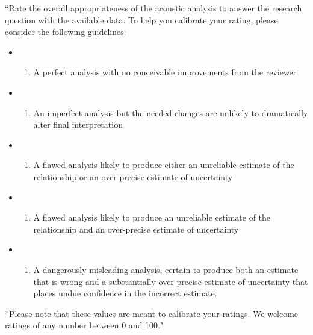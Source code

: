\documentclass[
  english,
  man]{apa6}
\providecommand{\tightlist}{%
  \setlength{\itemsep}{0pt}\setlength{\parskip}{0pt}}
\begin{document}
``Rate the overall appropriateness of the acoustic analysis to answer the research question with the available data. To help you calibrate your rating, please consider the following guidelines:

\begin{itemize}
\item
  \begin{enumerate}
  \def\labelenumi{\arabic{enumi}.}
  \setcounter{enumi}{99}
  \tightlist
  \item
    A perfect analysis with no conceivable improvements from the reviewer
  \end{enumerate}
\item
  \begin{enumerate}
  \def\labelenumi{\arabic{enumi}.}
  \setcounter{enumi}{74}
  \tightlist
  \item
    An imperfect analysis but the needed changes are unlikely to dramatically alter final interpretation
  \end{enumerate}
\item
  \begin{enumerate}
  \def\labelenumi{\arabic{enumi}.}
  \setcounter{enumi}{49}
  \tightlist
  \item
    A flawed analysis likely to produce either an unreliable estimate of the relationship or an over-precise estimate of uncertainty
  \end{enumerate}
\item
  \begin{enumerate}
  \def\labelenumi{\arabic{enumi}.}
  \setcounter{enumi}{24}
  \tightlist
  \item
    A flawed analysis likely to produce an unreliable estimate of the relationship and an over-precise estimate of uncertainty
  \end{enumerate}
\item
  \begin{enumerate}
  \def\labelenumi{\arabic{enumi}.}
  \setcounter{enumi}{-1}
  \tightlist
  \item
    A dangerously misleading analysis, certain to produce both an estimate that is wrong and a substantially over-precise estimate of uncertainty that places undue confidence in the incorrect estimate.
  \end{enumerate}
\end{itemize}

*Please note that these values are meant to calibrate your ratings.
We welcome ratings of any number between 0 and 100."
\end{document}
